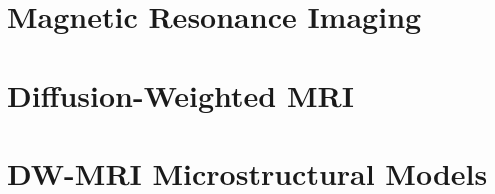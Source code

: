 \section{Magnetic Resonance Imaging}

\section{Diffusion-Weighted MRI}

\section{DW-MRI Microstructural Models}

